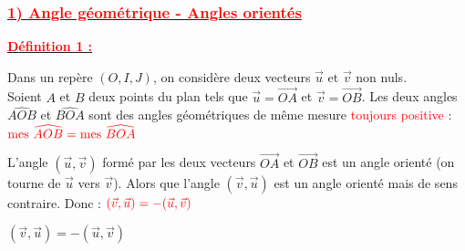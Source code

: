\documentclass[a4paper,12pt]{article}
\begin{document}
\subsubsection*{\underline{\textcolor{red}{1) Angle géométrique - Angles orientés}}}

\textbf{\underline{\textcolor{red}{Définition 1 :}}}

Dans un repère \( (O, I, J) \), on considère deux vecteurs \( \vec{u} \) et \( \vec{v} \) non nuls.\\
Soient \( A \) et \( B \) deux points du plan tels que \( \vec{u} = \overrightarrow{OA} \) et \( \vec{v} = \overrightarrow{OB} \). Les deux angles \( \widehat{AOB} \) et \( \widehat{BOA} \) sont des angles géométriques de même mesure \textcolor{red}{toujours positive} : 
\(\textcolor{red}{\text{mes } \widehat{AOB} = \text{mes } \widehat{BOA}}\)

L’angle \( (\vec{u}, \vec{v}) \) formé par les deux vecteurs \( \overrightarrow{OA} \) et \( \overrightarrow{OB} \) est un angle orienté (on tourne de \( \vec{u} \) vers \( \vec{v} \)). Alors que l’angle \( (\vec{v}, \vec{u}) \) est un angle orienté mais de sens contraire. Donc : \( \textcolor{red}{ (\vec{v}, \vec{u}) = -(\vec{u}, \vec{v})}\)
\begin{tcolorbox}[colback=red!5!white, colframe=red!75!black, title=Propriété 1]
\( (\vec{v}, \vec{u}) = -(\vec{u}, \vec{v}) \)
\end{tcolorbox}
\vspace{1em}

\begin{center}
\end{center}
\end{document}
